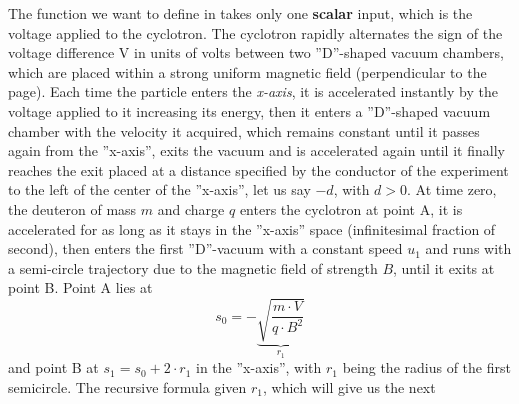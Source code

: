 \documentclass[10pt]{article}
\newcommand{\dsp}{\displaystyle}
\newcommand{\matlab}{\text{\color{red}matlab }}
\begin{document}
\begin{center}
\end{center}
The function we want to define in \matlab takes only one \textbf{scalar} input, which is 
the voltage applied to the cyclotron. The cyclotron rapidly alternates the sign of the 
voltage difference V in units of volts between two ''D''-shaped vacuum chambers, which 
are placed within a strong uniform magnetic field (perpendicular to the page). Each time 
the particle enters the \textit{x-axis}, it is accelerated instantly by the voltage 
applied to it increasing its energy, then it enters a ''D''-shaped vacuum chamber with the
velocity it acquired, which remains constant until it passes again from the ''x-axis'', 
exits the vacuum and is accelerated again until it finally reaches the exit placed at a 
distance specified by the conductor of the experiment to the left of the center of the 
''x-axis'', let us say $-d$, with $d>0$. At time zero, the deuteron of mass $m$ and 
charge $q$  enters the cyclotron at point A, it is accelerated for as long as  it stays in 
the ''x-axis'' space (infinitesimal fraction of second), then enters the first 
''D''-vacuum with a constant speed $u_{1}$ and runs with a semi-circle trajectory due to 
the magnetic field of strength $B$, until it exits at point B. Point A lies at \[s_{0} 
= -\underbrace{\sqrt{\frac{m\cdot V}{q\cdot B^2}}}_{r_{1}}\]  and point 
B at $\dsp s_{1} = s_{0}+2\cdot r_{1}$ in the ''x-axis'', with $r_{1}$ being the radius 
of the first semicircle. The recursive formula given $r_1$, which will give us the next 
\end{document}
